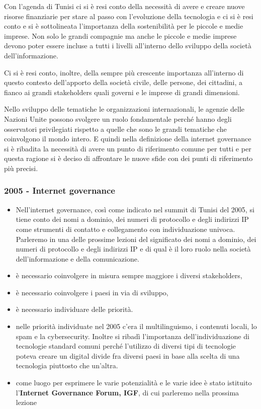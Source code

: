 Con l'agenda di Tunisi ci si è resi conto della necessità di avere e creare nuove risorse finanziarie per stare al passo con l'evoluzione della tecnologia e ci si è resi conto e si è sottolineata l'importanza della sostenibilità per le piccole e medie imprese. Non solo le grandi compagnie ma anche le piccole e medie imprese devono poter essere incluse a tutti i livelli all'interno dello sviluppo della società dell'informazione.

Ci si è resi conto, inoltre, della sempre più crescente importanza all'interno di questo contesto dell'apporto della società civile, delle persone, dei cittadini, a fianco ai grandi stakeholders quali governi e le imprese di grandi dimensioni.

Nello sviluppo delle tematiche le organizzazioni internazionali, le agenzie delle Nazioni Unite possono svolgere un ruolo fondamentale perché hanno degli osservatori privilegiati rispetto a quelle che sono le grandi tematiche che coinvolgono il mondo intero. E quindi nella definizione della internet governance si è ribadita la necessità di avere un punto di riferimento comune per tutti e per questa ragione si è deciso di affrontare le nuove sfide con dei punti di riferimento più precisi.

\subsubsection{2005 - Internet governance}

\begin{itemize}
    \item Nell'internet governance, così come indicato nel summit di Tunisi del 2005, si tiene conto dei nomi a dominio, dei numeri di protocollo e degli indirizzi IP come strumenti di contatto e collegamento con individuazione univoca. Parleremo in una delle prossime lezioni del significato dei nomi a dominio, dei numeri di protocollo e degli indirizzi IP e di qual è il loro ruolo nella società dell'informazione e della comunicazione.

    \item è necessario coinvolgere in misura sempre maggiore i diversi stakeholders,
    
    \item è necessario coinvolgere i paesi in via di sviluppo,
    
    \item è necessario individuare delle priorità.
    
    \item nelle priorità individuate nel 2005 c'era il multilinguismo, i contenuti locali, lo spam e la cybersecurity. Inoltre si ribadì l'importanza dell'individuazione di tecnologie standard comuni perché l'utilizzo di diversi tipi di tecnologie poteva creare un digital divide fra diversi paesi in base alla scelta di una tecnologia piuttosto che un'altra.
    
    \item come luogo per esprimere le varie potenzialità e le varie idee è stato istituito l'\textbf{Internet Governance Forum, IGF}, di cui parleremo nella prossima lezione
\end{itemize}

